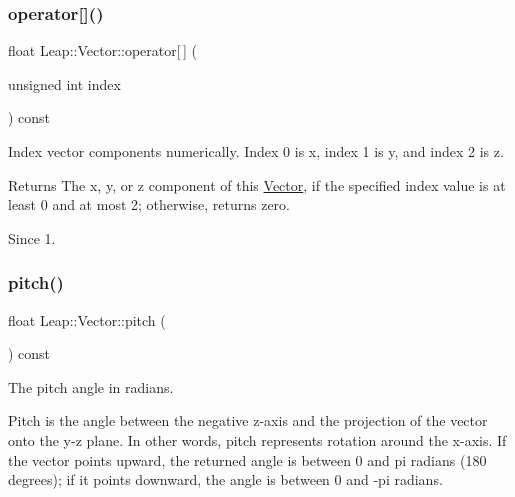 \subsubsection{\texorpdfstring{operator[]()}{operator[]()}}
{\footnotesize\ttfamily float Leap\+::\+Vector\+::operator\mbox{[}$\,$\mbox{]} (\begin{DoxyParamCaption}\item[{unsigned int}]{index }\end{DoxyParamCaption}) const\hspace{0.3cm}{\ttfamily [inline]}}

Index vector components numerically. Index 0 is x, index 1 is y, and index 2 is z. \begin{DoxyReturn}{Returns}
The x, y, or z component of this \hyperlink{struct_leap_1_1_vector}{Vector}, if the specified index value is at least 0 and at most 2; otherwise, returns zero.
\end{DoxyReturn}

\begin{DoxyCodeInclude}
\end{DoxyCodeInclude}
 \begin{DoxySince}{Since}
1. 
\end{DoxySince}
\mbox{\label{struct_leap_1_1_vector_a214e71f85bcf03950df1c86922d07634}} 
\subsubsection{\texorpdfstring{pitch()}{pitch()}}
{\footnotesize\ttfamily float Leap\+::\+Vector\+::pitch (\begin{DoxyParamCaption}{ }\end{DoxyParamCaption}) const\hspace{0.3cm}{\ttfamily [inline]}}

The pitch angle in radians.

Pitch is the angle between the negative z-\/axis and the projection of the vector onto the y-\/z plane. In other words, pitch represents rotation around the x-\/axis. If the vector points upward, the returned angle is between 0 and pi radians (180 degrees); if it points downward, the angle is between 0 and -\/pi radians.




\begin{DoxyCodeInclude}
\end{DoxyCodeInclude}


